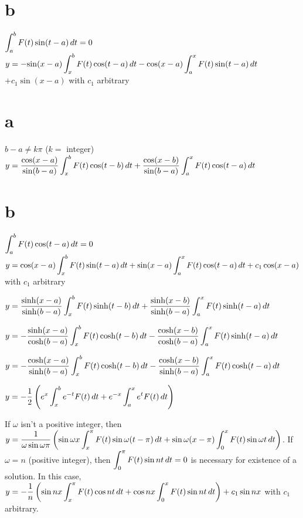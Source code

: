 \part{b}\;    $\displaystyle{\int_{a}^{b}F(t)\sin(t-a)\,dt=0}$
$y=-\displaystyle{\sin(x-a)\int_{x}^{b}F(t)\cos(t-a)\,dt
-\cos(x-a)\int_{a}^{x}F(t)\sin(t-a)\,dt}$
$+c_{1}\sin(x-a)$ with  $c_{1}$ arbitrary

\smallskip

 \part{a}\;    $b-a\ne k\pi$ ($k=$ integer)
$y=\displaystyle{\frac{\cos(x-a)}{\sin(b-a)}\int_{x}^{b}F(t)\cos(t-b)\,dt+
\frac{\cos(x-b)}{\sin(b-a)}\int_{a}^{x}F(t)\cos(t-a)\,dt}$
\part{b} $\displaystyle{\int_{a}^{b}F(t)\cos(t-a)\,dt=0}$
$y=\displaystyle{\cos(x-a)\int_{x}^{b} F(t)\sin(t-a)\,dt +\sin(x-a)\int_{a}^{x}
F(t)\cos(t-a)\,dt}+c_{1}\cos(x-a)$  with $c_{1}$ arbitrary

\smallskip

$y=\displaystyle{\frac{\sinh(x-a)}{\sinh(b-a)}\int_{x}^{b}F(t)\sinh(t-b)\,dt
+\frac{\sinh(x-b)}{\sinh(b-a)}\int_{a}^{x}F(t)\sinh(t-a)\,dt}$

\smallskip

$y=\displaystyle{-\frac{\sinh(x-a)}{\cosh(b-a)}\int_{x}^{b}F(t)\cosh(t-b)\,dt
-\frac{\cosh(x-b)}{\cosh(b-a)}\int_{a}^{x}F(t)\sinh(t-a)\,dt}$

\smallskip

$y=-\displaystyle{\frac{\cosh(x-a)}{\sinh(b-a)}\int_{x}^{b}F(t)\cosh(t-b)\,dt
-\frac{\cosh(x-b)}{\sinh(b-a)}\int_{a}^{x}F(t)\cosh(t-a)\,dt}$
\smallskip

$y=-\displaystyle{\frac{1}{2}\left(
e^{x}\int_{x}^{b}e^{-t}F(t)\,dt+e^{-x}\int_{a}^{x}e^{t}F(t)\,dt\right)}$

\smallskip

 If $\omega$ isn't  a positive integer, then
$y=\displaystyle{\frac{1}{\omega\sin\omega\pi}
\left(\sin\omega x\int_{x}^{\pi}F(t)\sin\omega(t-\pi)\,dt
+\sin\omega(x-\pi)\int_{0}^{x}F(t)\sin\omega t\,dt\right)}$.
If $\omega=n$ (positive integer), then $\displaystyle{\int_{0}^{\pi}F(t)\sin
nt\,dt=0}$ is necessary for existence
of a solution. In this case,
$y=-\displaystyle{\frac{1}{n}\left(\sin nx\int_{x}^{\pi}F(t)\cos nt\,dt
+\cos nx\int_{0}^{x} F(t)\sin nt\,dt\right) +c_{1}\sin nx}$
 with $c_{1}$ arbitrary.

